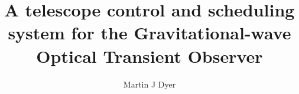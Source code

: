 \documentclass[a4paper,12pt,oneside,openright,nohints]{report}
\begin{document}
\title{A telescope control and scheduling system for the Gravitational-wave Optical Transient Observer}
\author{Martin J Dyer}

\singlespacing{}
\pagestyle{empty}



\doublespacing{}
\pagestyle{plain}








\cleardoublepage{}
\pagestyle{fancy}











\pagestyle{plain}


%

%
\end{document}
